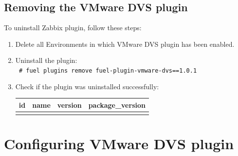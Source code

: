 \documentclass{article}
\begin{document}
\subsection{Removing the VMware DVS plugin}

To uninstall Zabbix plugin, follow these steps:

\begin{enumerate}

\item Delete all Environments in which VMware DVS plugin has been enabled.

\item Uninstall the plugin:\\
{\tt
\# fuel plugins \textemdash\textemdash remove fuel-plugin-vmware-dvs==1.0.1
}

\item Check if the plugin was uninstalled successfully:

\begin{tabular}{l|l|l|l}
id & name                   & version & package\_version\\
\hline
  &  &   &          \\
\end{tabular}

\end{enumerate}

\newpage

\section{Configuring VMware DVS plugin}
\end{document}
